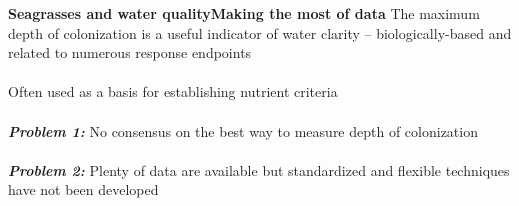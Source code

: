 \documentclass[serif]{beamer}\usepackage[]{graphicx}\usepackage[]{color}
\newcommand{\emtxt}[1]{\textbf{\textit{#1}}}
\begin{document}
\begin{frame}{\textbf{Seagrasses and water quality}}{\textbf{Making the most of data}}
\onslide<+->
The maximum depth of colonization is a useful indicator of water clarity -- biologically-based and related to numerous response endpoints \\~\\
Often used as a basis for establishing nutrient criteria \\~\\
\onslide<+->
\emtxt{Problem 1:} No consensus on the best way to measure depth of colonization\\~\\
\emtxt{Problem 2:} Plenty of data are available but standardized and flexible techniques have not been developed
\end{frame}
\end{document}
